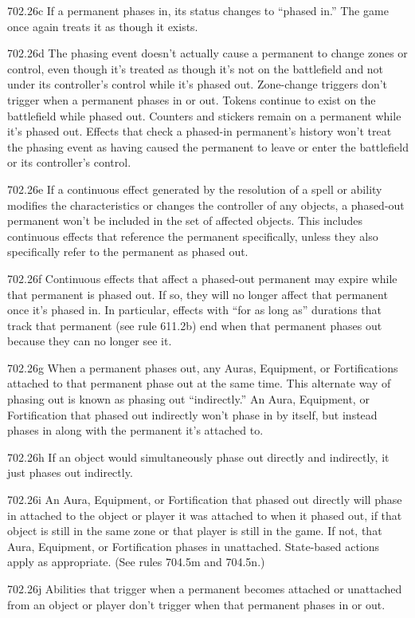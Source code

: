 702.26c If a permanent phases in, its status changes to “phased in.” The game once again treats it as though it exists.

702.26d The phasing event doesn’t actually cause a permanent to change zones or control, even though it’s treated as though it’s not on the battlefield and not under its controller’s control while it’s phased out. Zone-change triggers don’t trigger when a permanent phases in or out. Tokens continue to exist on the battlefield while phased out. Counters and stickers remain on a permanent while it’s phased out. Effects that check a phased-in permanent’s history won’t treat the phasing event as having caused the permanent to leave or enter the battlefield or its controller’s control.

702.26e If a continuous effect generated by the resolution of a spell or ability modifies the characteristics or changes the controller of any objects, a phased-out permanent won’t be included in the set of affected objects. This includes continuous effects that reference the permanent specifically, unless they also specifically refer to the permanent as phased out.

702.26f Continuous effects that affect a phased-out permanent may expire while that permanent is phased out. If so, they will no longer affect that permanent once it’s phased in. In particular, effects with “for as long as” durations that track that permanent (see rule 611.2b) end when that permanent phases out because they can no longer see it.

702.26g When a permanent phases out, any Auras, Equipment, or Fortifications attached to that permanent phase out at the same time. This alternate way of phasing out is known as phasing out “indirectly.” An Aura, Equipment, or Fortification that phased out indirectly won’t phase in by itself, but instead phases in along with the permanent it’s attached to.

702.26h If an object would simultaneously phase out directly and indirectly, it just phases out indirectly.

702.26i An Aura, Equipment, or Fortification that phased out directly will phase in attached to the object or player it was attached to when it phased out, if that object is still in the same zone or that player is still in the game. If not, that Aura, Equipment, or Fortification phases in unattached. State-based actions apply as appropriate. (See rules 704.5m and 704.5n.)

702.26j Abilities that trigger when a permanent becomes attached or unattached from an object or player don’t trigger when that permanent phases in or out.


